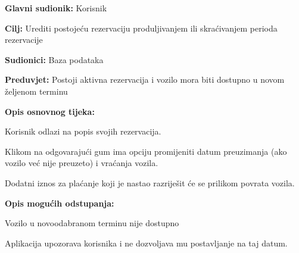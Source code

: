 					\noindent {}
					\begin{packed_item}
	
						\item \textbf{Glavni sudionik: }Korisnik
						\item  \textbf{Cilj: }Urediti postojeću rezervaciju produljivanjem ili skraćivanjem perioda rezervacije
						\item  \textbf{Sudionici: }Baza podataka
						\item  \textbf{Preduvjet: }Postoji aktivna rezervacija i vozilo mora biti dostupno u novom željenom terminu
						\item  \textbf{Opis osnovnog tijeka:}
						
						\item[] \begin{packed_enum}
							\item Korisnik odlazi na popis svojih rezervacija.
							\item Klikom na odgovarajući gum ima opciju promijeniti datum preuzimanja (ako vozilo već nije preuzeto) i vraćanja vozila.
							\item Dodatni iznos za plaćanje koji je nastao razriješit će se prilikom povrata vozila.
						\end{packed_enum}
						
						\item  \textbf{Opis mogućih odstupanja: }
						
						\item[] \begin{packed_item}
	
							\item[2.a] Vozilo u novoodabranom terminu nije dostupno
							\item[] \begin{packed_enum}
								\item Aplikacija upozorava korisnika i ne dozvoljava mu postavljanje na taj datum.
							\end{packed_enum}
						\end{packed_item}
					\end{packed_item}
					

